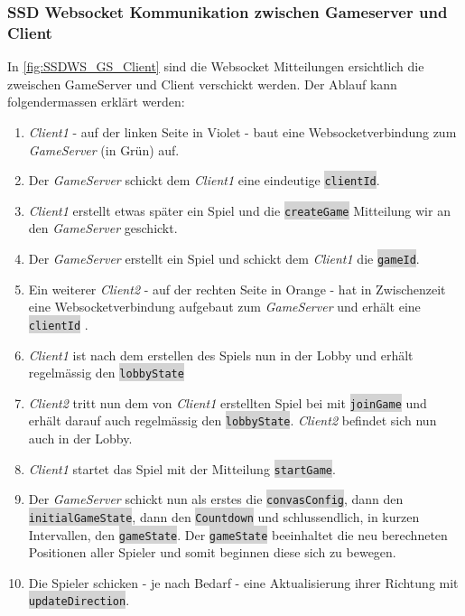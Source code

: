 \documentclass[11pt,ngerman]{article}
\newcommand{\inlinecode}[2]{\colorbox{lightgray}{\lstinline[language=#1]$#2$}}
\begin{document}
    \subsubsection{SSD \Gls{Websocket} Kommunikation zwischen Gameserver und Client}
    In \autoref{fig:SSDWS_GS_Client} sind die \Gls{Websocket} Mitteilungen ersichtlich die zweischen GameServer und Client verschickt werden. Der Ablauf kann folgendermassen erklärt werden:
    \begin{enumerate}
        \item \textit{Client1} - auf der linken Seite in Violet - baut eine Websocketverbindung zum \textit{GameServer} (in Grün) auf.
        \item Der \textit{GameServer} schickt dem \textit{Client1} eine eindeutige \inlinecode{bash}{clientId}.
        \item \textit{Client1} erstellt etwas später ein Spiel und die \inlinecode{bash}{createGame} Mitteilung wir an den \textit{GameServer} geschickt.
        \item Der \textit{GameServer} erstellt ein Spiel und schickt dem \textit{Client1} die \inlinecode{bash}{gameId}.
        \item Ein weiterer \textit{Client2} - auf der rechten Seite in Orange - hat in Zwischenzeit eine Websocketverbindung aufgebaut zum \textit{GameServer} und erhält eine \inlinecode{bash}{clientId} .
        \item \textit{Client1} ist nach dem erstellen des Spiels nun in der Lobby und erhält regelmässig den \inlinecode{bash}{lobbyState}
        \item \textit{Client2} tritt nun dem von \textit{Client1} erstellten Spiel bei mit \inlinecode{bash}{joinGame} und erhält darauf auch regelmässig den \inlinecode{bash}{lobbyState}. \textit{Client2} befindet sich nun auch in der Lobby.
        \item \textit{Client1} startet das Spiel mit der Mitteilung \inlinecode{bash}{startGame}.
        \item Der \textit{GameServer} schickt nun als erstes die \inlinecode{bash}{convasConfig}, dann den \inlinecode{bash}{initialGameState}, dann den \inlinecode{bash}{Countdown} und schlussendlich, in kurzen Intervallen, den \inlinecode{bash}{gameState}. Der \inlinecode{bash}{gameState} beeinhaltet die neu berechneten Positionen aller Spieler und somit beginnen diese sich zu bewegen.
        \item Die Spieler schicken - je nach Bedarf - eine Aktualisierung ihrer Richtung mit \inlinecode{bash}{updateDirection}.

\end{enumerate}
\end{document}
